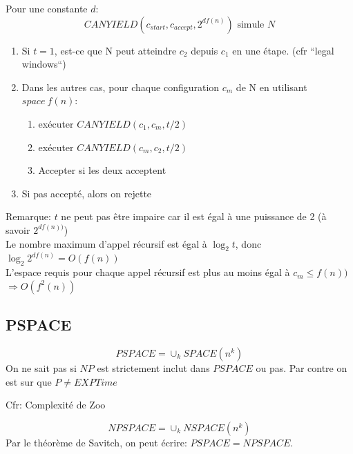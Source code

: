 \documentclass[a4paper,12pt]{article}
\begin{document}
    Pour une constante $d$:
    $$CANYIELD(c_{start}, c_{accept}, 2^{df(n)}) \text{ simule } N$$
    \begin{enumerate}
      \item Si $t = 1$, est-ce que N peut atteindre $c_2$ depuis $c_1$ en une étape.  (cfr ``legal windows``)
      \item Dans les autres cas, pour chaque configuration $c_m$ de N en utilisant $space\ f(n)$:
	\begin{enumerate}
	  \item exécuter $CANYIELD(c_1, c_m, t/2)$
	  \item exécuter $CANYIELD(c_m, c_2, t/2)$
	  \item Accepter si les deux acceptent
	\end{enumerate}
      \item Si pas accepté, alors on rejette
    \end{enumerate}
    Remarque: $t$ ne peut pas être impaire car il est égal à une puissance de 2 (à savoir $2^{df(n))}$)\\

    Le nombre maximum d'appel récursif est égal à $\log_2 t$, donc $\log_2 2^{df(n)} = O(f(n))$\\
    L'espace requis pour chaque appel récursif est plus au moins égal à $c_m \leq f(n))$\\
    $\Rightarrow O(f^2(n))$


  \subsection{PSPACE}
    $$PSPACE = \cup_{k} SPACE(n^k)$$
    On ne sait pas si $NP$ est strictement inclut dans $PSPACE$ ou pas.  Par contre on est sur que $P \neq EXPTime$

    Cfr: Complexité de Zoo

    $$NPSPACE = \cup_{k} NSPACE(n^k)$$
    Par le théorème de Savitch, on peut écrire: $PSPACE = NPSPACE$.
\end{document}
